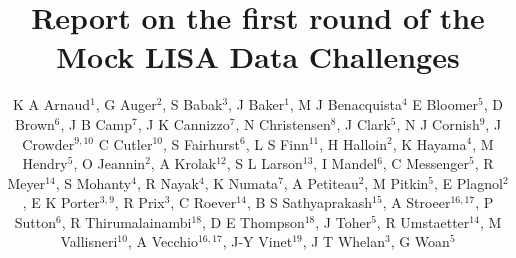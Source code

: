 \documentclass[12pt]{iopart}
\begin{document}
\title[MLDC first round report]{Report on the first round of the Mock LISA Data Challenges}

\author{K A Arnaud$^1$,
G Auger$^2$,
S Babak$^3$,
J Baker$^1$,
M J Benacquista$^4$
E Bloomer$^5$,
D Brown$^6$,
J B Camp$^7$,
J K Cannizzo$^7$,
N Christensen$^8$,
J Clark$^5$,
N J Cornish$^9$,
J Crowder$^{9,10}$
C Cutler$^{10}$,
S Fairhurst$^6$,
L S Finn$^{11}$,
H Halloin$^2$,
K Hayama$^4$,
M Hendry$^5$,
O Jeannin$^2$,
A Krolak$^{12}$,
S L Larson$^{13}$,
I Mandel$^6$,
C Messenger$^5$,
R Meyer$^{14}$,
S Mohanty$^4$,
R Nayak$^4$,
K Numata$^7$,
A Petiteau$^2$,
M Pitkin$^5$,
E Plagnol$^2$,
E K Porter$^{3,9}$,
R Prix$^3$,
C Roever$^{14}$,
B S Sathyaprakash$^{15}$,
A Stroeer$^{16,17}$,
P Sutton$^{6}$,
R Thirumalainambi$^{18}$,
D E Thompson$^{18}$,
J Toher$^5$,
R Umstaetter$^{14}$,
M Vallisneri$^{10}$,
A Vecchio$^{16,17}$,
J-Y Vinet$^{19}$,
J T Whelan$^3$,
G Woan$^5$}
\end{document}
